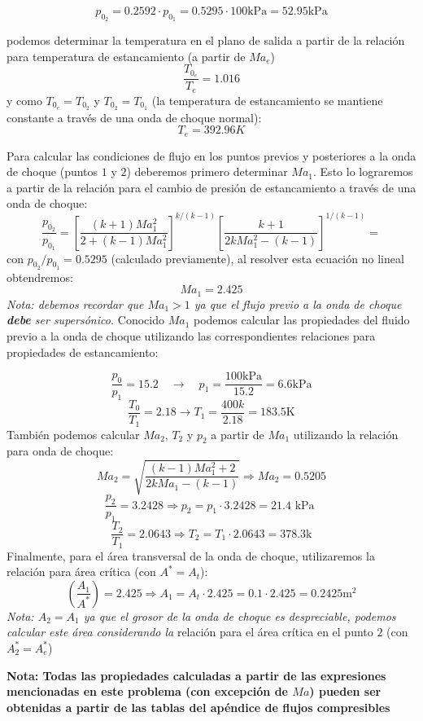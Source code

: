 \documentclass[11pt]{report}
\begin{document}
$$p_{0_2}=0.2592\cdot p_{0_1}=0.5295\cdot 100\mathrm{kPa} = 52.95 \mathrm{kPa}$$

podemos determinar la temperatura en el plano de salida a partir de la relaci\'on para temperatura de estancamiento (a partir de $Ma_e$)
$$\frac{T_{0_e}}{T_e}=1.016$$
y como $T_{0_e}=T_{0_2}$ y $T_{0_2}=T_{0_1}$ (la temperatura de estancamiento se mantiene constante a trav\'es de una onda de choque normal):
$$
T_{e}=392.96 K
$$

Para calcular las condiciones de flujo en los puntos previos y posteriores a la onda de choque (puntos $1$ y $2$) deberemos primero determinar $Ma_1$. Esto lo lograremos a partir de la relaci\'on  para el cambio de presi\'on de estancamiento a trav\'es de una onda de choque:
$$
\frac{p_{0_{2}}}{p_{0_{1}}}=\left[\frac{(k+1) M a_{1}^{2}}{2+(k-1) M a_{1}^{2}}\right]^{k /(k-1)}\left[\frac{k+1}{2 k M a_{1}^{2}-(k-1)}\right]^{1 /(k-1)}=
$$
con $p_{0_2}/p_{0_1}=0.5295$ (calculado previamente), al resolver esta ecuaci\'on no lineal obtendremos:
$$
M a_{1}=2.425
$$
\textit{Nota: debemos recordar que $Ma_1>1$ ya que el flujo previo a la onda de choque \textbf{debe} ser supers\'onico.}
Conocido $Ma_1$ podemos calcular las propiedades del fluido previo a la onda de choque utilizando las correspondientes relaciones para propiedades de estancamiento:

$$
\frac{p_{0}}{p_{1}}=15.2 \quad \rightarrow \quad p_{1}=\frac{100 \mathrm{kPa}}{15.2}=6.6 \mathrm{kPa}
$$
$$
\frac{T_{0}}{T_{1}}=2.18 \longrightarrow T_{1}=\frac{400 k}{2.18}=183.5 \mathrm{K}
$$
Tambi\'en podemos calcular $Ma_2$, $T_2$ y $p_2$ a partir de $Ma_1$ utilizando la relaci\'on para onda de choque:
$$
M a_{2}=\sqrt{\frac{(k-1) M a_{1}^{2}+2}{2 k M a_{1}-(k-1)}} \Rightarrow M a_{2}=0.5205
$$
$$
\frac{p_{2}}{p_{1}}=3.2428 \Rightarrow p_{2}=p_{1} \cdot 3.2428=21.4 \text { kPa }
$$
$$
\frac{T_{2}}{T_{1}}=2.0643 \Rightarrow T_{2}=T_{1} \cdot 2.0643=378.3 \mathrm{k}
$$
Finalmente, para el \'area transversal de la onda de choque, utilizaremos la relaci\'on para \'area cr\'itica (con $A^*=A_t$):
$$
\left(\frac{A_{1}}{A^{*}}\right)=2.425 \Rightarrow A_{1}=A_{t} \cdot 2.425=0.1 \cdot 2.425=0.2425\mathrm{m}^2
$$
\textit{Nota: $A_2=A_1$ ya que el grosor de la onda de choque es despreciable, podemos calcular este \'area considerando la} relaci\'on para el \'area cr\'itica en el punto $2$ (con $A_2^*=A_e^*$)

\textbf{Nota: Todas las propiedades calculadas a partir de las expresiones mencionadas en este problema (con excepci\'on de $Ma$) pueden ser obtenidas a partir de las tablas del ap\'endice de flujos compresibles}
\end{document}
